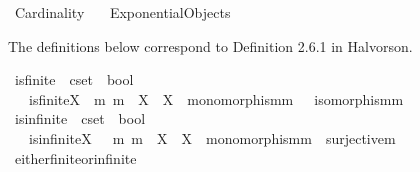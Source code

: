 %
\begin{isabellebody}%
%
%
\isadelimtheory
%
\endisadelimtheory
%
\isatagtheory
{}\isamarkupfalse%
\ Cardinality\isanewline
\ \ \ Exponential{\isacharunderscore}{\kern0pt}Objects\isanewline
{}%
\endisatagtheory
{\isafoldtheory}%
%
\isadelimtheory
%
\endisadelimtheory
%
\isadelimdocument
%
\endisadelimdocument
%
\isatagdocument
%
\isamarkuptrue%
%
\endisatagdocument
{\isafolddocument}%
%
\isadelimdocument
%
\endisadelimdocument
%
\begin{isamarkuptext}%
The definitions below correspond to Definition 2.6.1 in Halvorson.%
\end{isamarkuptext}\isamarkuptrue%
\isamarkupfalse%
\ is{\isacharunderscore}{\kern0pt}finite\ {\isacharcolon}{\kern0pt}{\isacharcolon}{\kern0pt}\ {\isachardoublequoteopen}cset\ {\isasymRightarrow}\ bool{\isachardoublequoteclose}\ \ \isanewline
\ \ \ {\isachardoublequoteopen}is{\isacharunderscore}{\kern0pt}finite{\isacharparenleft}{\kern0pt}X{\isacharparenright}{\kern0pt}\ {\isasymlongleftrightarrow}\ {\isacharparenleft}{\kern0pt}{\isasymforall}m{\isachardot}{\kern0pt}\ {\isacharparenleft}{\kern0pt}m\ {\isacharcolon}{\kern0pt}\ X\ {\isasymrightarrow}\ X\ {\isasymand}\ monomorphism{\isacharparenleft}{\kern0pt}m{\isacharparenright}{\kern0pt}{\isacharparenright}{\kern0pt}\ {\isasymlongrightarrow}\ \ isomorphism{\isacharparenleft}{\kern0pt}m{\isacharparenright}{\kern0pt}{\isacharparenright}{\kern0pt}{\isachardoublequoteclose}\isanewline
\isanewline
{}\isamarkupfalse%
\ is{\isacharunderscore}{\kern0pt}infinite\ {\isacharcolon}{\kern0pt}{\isacharcolon}{\kern0pt}\ {\isachardoublequoteopen}cset\ {\isasymRightarrow}\ bool{\isachardoublequoteclose}\ \ \isanewline
\ \ \ {\isachardoublequoteopen}is{\isacharunderscore}{\kern0pt}infinite{\isacharparenleft}{\kern0pt}X{\isacharparenright}{\kern0pt}\ {\isasymlongleftrightarrow}\ {\isacharparenleft}{\kern0pt}{\isasymexists}\ m{\isachardot}{\kern0pt}\ {\isacharparenleft}{\kern0pt}m\ {\isacharcolon}{\kern0pt}\ X\ {\isasymrightarrow}\ X\ {\isasymand}\ monomorphism{\isacharparenleft}{\kern0pt}m{\isacharparenright}{\kern0pt}\ {\isasymand}\ {\isasymnot}surjective{\isacharparenleft}{\kern0pt}m{\isacharparenright}{\kern0pt}{\isacharparenright}{\kern0pt}{\isacharparenright}{\kern0pt}{\isachardoublequoteclose}\isanewline
\isanewline
{}\isamarkupfalse%
\ either{\isacharunderscore}{\kern0pt}finite{\isacharunderscore}{\kern0pt}or{\isacharunderscore}{\kern0pt}infinite{\isacharcolon}{\kern0pt}\isanewline

\end{isabellebody}
